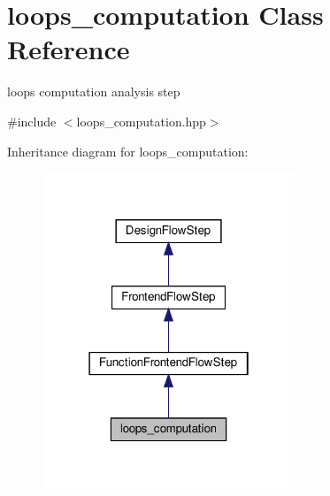 \hypertarget{classloops__computation}{}\section{loops\+\_\+computation Class Reference}
\label{classloops__computation}


loops computation analysis step  




{\ttfamily \#include $<$loops\+\_\+computation.\+hpp$>$}



Inheritance diagram for loops\+\_\+computation\+:
\nopagebreak
\begin{figure}[H]
\begin{center}
\leavevmode
\includegraphics[width=214pt]{df/d5c/classloops__computation__inherit__graph}
\end{center}
\end{figure}


